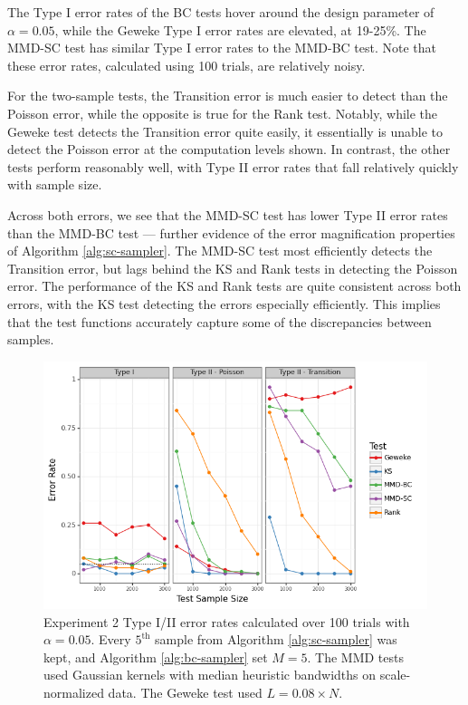 \documentclass[a4paper,12pt]{article}
\begin{document}
The Type I error rates of the BC tests hover around the design parameter of $\alpha=0.05$, while the Geweke Type I error rates are elevated, at 19-25\%. The MMD-SC test has similar Type I error rates to the MMD-BC test. Note that these error rates, calculated using 100 trials, are relatively noisy.

For the two-sample tests, the Transition error is much easier to detect than the Poisson error, while the opposite is true for the Rank test.  Notably, while the Geweke test detects the Transition error quite easily, it essentially is unable to detect the Poisson error at the computation levels shown. In contrast, the other tests perform reasonably well, with Type II error rates that fall relatively quickly with sample size. 

Across both errors, we see that the MMD-SC test has lower Type II error rates than the MMD-BC test --- further evidence of the error magnification properties of Algorithm \ref{alg:sc-sampler}. The MMD-SC test most efficiently detects the Transition error, but lags behind the KS and Rank tests in detecting the Poisson error. The performance of the KS and Rank tests are quite consistent across both errors, with the KS test detecting the errors especially efficiently. This implies that the test functions accurately capture some of the discrepancies between samples.

\begin{figure}[H]
    \centering
    \includegraphics[width=\textwidth]{figures/bayes_lasso_comparison.png}
    \caption{Experiment 2 Type I/II error rates calculated over 100 trials with $\alpha=0.05$. Every $5^{\text{th}}$ sample from Algorithm \ref{alg:sc-sampler} was kept, and Algorithm \ref{alg:bc-sampler} set $M=5$. The MMD tests used Gaussian kernels with median heuristic bandwidths on scale-normalized data. The Geweke test used  $L = 0.08 \times N$.}
    \label{fig:ex2_comparison}
\end{figure}
\end{document}
